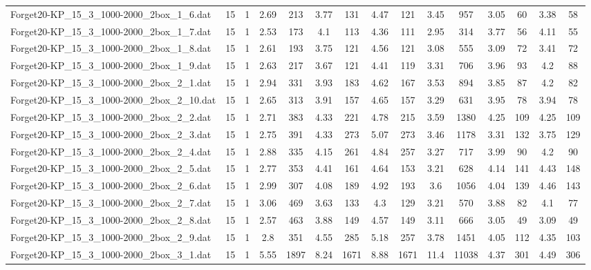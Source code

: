 \begin{table}[!ht]
{\begin{tabular}{lcccccccccccccc}
Forget20-KP\_15\_3\_1000-2000\_2box\_1\_6.dat & 15 & 1 & 2.69 & 213 & 3.77 & 131 & 4.47 & 121 & 3.45 & 957 & 3.05 & 60 & 3.38 & 58 \\
Forget20-KP\_15\_3\_1000-2000\_2box\_1\_7.dat & 15 & 1 & 2.53 & 173 & 4.1 & 113 & 4.36 & 111 & 2.95 & 314 & 3.77 & 56 & 4.11 & 55 \\
Forget20-KP\_15\_3\_1000-2000\_2box\_1\_8.dat & 15 & 1 & 2.61 & 193 & 3.75 & 121 & 4.56 & 121 & 3.08 & 555 & 3.09 & 72 & 3.41 & 72 \\
Forget20-KP\_15\_3\_1000-2000\_2box\_1\_9.dat & 15 & 1 & 2.63 & 217 & 3.67 & 121 & 4.41 & 119 & 3.31 & 706 & 3.96 & 93 & 4.2 & 88 \\
Forget20-KP\_15\_3\_1000-2000\_2box\_2\_1.dat & 15 & 1 & 2.94 & 331 & 3.93 & 183 & 4.62 & 167 & 3.53 & 894 & 3.85 & 87 & 4.2 & 82 \\
Forget20-KP\_15\_3\_1000-2000\_2box\_2\_10.dat & 15 & 1 & 2.65 & 313 & 3.91 & 157 & 4.65 & 157 & 3.29 & 631 & 3.95 & 78 & 3.94 & 78 \\
Forget20-KP\_15\_3\_1000-2000\_2box\_2\_2.dat & 15 & 1 & 2.71 & 383 & 4.33 & 221 & 4.78 & 215 & 3.59 & 1380 & 4.25 & 109 & 4.25 & 109 \\
Forget20-KP\_15\_3\_1000-2000\_2box\_2\_3.dat & 15 & 1 & 2.75 & 391 & 4.33 & 273 & 5.07 & 273 & 3.46 & 1178 & 3.31 & 132 & 3.75 & 129 \\
Forget20-KP\_15\_3\_1000-2000\_2box\_2\_4.dat & 15 & 1 & 2.88 & 335 & 4.15 & 261 & 4.84 & 257 & 3.27 & 717 & 3.99 & 90 & 4.2 & 90 \\
Forget20-KP\_15\_3\_1000-2000\_2box\_2\_5.dat & 15 & 1 & 2.77 & 353 & 4.41 & 161 & 4.64 & 153 & 3.21 & 628 & 4.14 & 141 & 4.43 & 148 \\
Forget20-KP\_15\_3\_1000-2000\_2box\_2\_6.dat & 15 & 1 & 2.99 & 307 & 4.08 & 189 & 4.92 & 193 & 3.6 & 1056 & 4.04 & 139 & 4.46 & 143 \\
Forget20-KP\_15\_3\_1000-2000\_2box\_2\_7.dat & 15 & 1 & 3.06 & 469 & 3.63 & 133 & 4.3 & 129 & 3.21 & 570 & 3.88 & 82 & 4.1 & 77 \\
Forget20-KP\_15\_3\_1000-2000\_2box\_2\_8.dat & 15 & 1 & 2.57 & 463 & 3.88 & 149 & 4.57 & 149 & 3.11 & 666 & 3.05 & 49 & 3.09 & 49 \\
Forget20-KP\_15\_3\_1000-2000\_2box\_2\_9.dat & 15 & 1 & 2.8 & 351 & 4.55 & 285 & 5.18 & 257 & 3.78 & 1451 & 4.05 & 112 & 4.35 & 103 \\
Forget20-KP\_15\_3\_1000-2000\_2box\_3\_1.dat & 15 & 1 & 5.55 & 1897 & 8.24 & 1671 & 8.88 & 1671 & 11.4 & 11038 & 4.37 & 301 & 4.49 & 306 \\

\end{tabular}}
\end{table}
